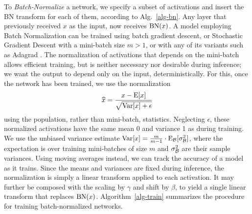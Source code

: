 \documentclass[twocolumn]{article}
\begin{document}
To {\em Batch-Normalize} a network, we specify a subset of activations
and insert the BN transform for each of them, according to
Alg.~\ref{alg-bn}. Any layer that previously received $x$ as the
input, now receives $\text{BN}(x)$.  A model employing Batch
Normalization can be trained using batch gradient descent, or
Stochastic Gradient Descent with a mini-batch size $m>1$, or with any
of its variants such as Adagrad \cite{adagrad}.  The normalization of activations
that depends on the mini-batch allows efficient training, but is
neither necessary nor desirable during inference; we want the output
to depend only on the input, deterministically. For this, once the
network has been trained, we use the
normalization $$\widehat{x}=\frac{x-\text{E}[x]}{\sqrt{\text{Var}[x]+\epsilon}}$$ using
the population, rather than mini-batch, statistics. Neglecting
$\epsilon$, these normalized activations have the same mean 0 and
variance 1 as during training. We use the unbiased variance estimate
$\text{Var}[x] = \frac{m}{m-1}\cdot\text{E}_{\mathcal{B}}[\sigma_{\mathcal{B}}^2]$, where the
expectation is over training mini-batches of size $m$ and
$\sigma_{\mathcal{B}}^2$ are their sample variances. Using moving averages
instead, we can track the accuracy of a model as it trains.  Since the
means and variances are fixed during inference, the normalization is
simply a linear transform applied to each activation. It may further
be composed with the scaling by $\gamma$ and shift by $\beta$, to
yield a single linear transform that replaces $\text{BN}(x)$.
Algorithm~\ref{alg-train} summarizes the procedure for training
batch-normalized networks.
\end{document}
